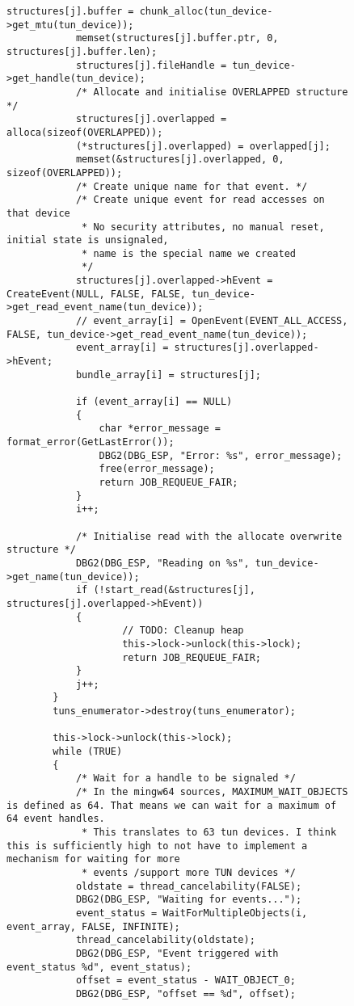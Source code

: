 \begin{figure}
\begin{lstlisting}[caption=Code für handle\_plain auf Windows]
            structures[j].buffer = chunk_alloc(tun_device->get_mtu(tun_device));
            memset(structures[j].buffer.ptr, 0, structures[j].buffer.len);
            structures[j].fileHandle = tun_device->get_handle(tun_device);
            /* Allocate and initialise OVERLAPPED structure */
            structures[j].overlapped = alloca(sizeof(OVERLAPPED));
            (*structures[j].overlapped) = overlapped[j];
            memset(&structures[j].overlapped, 0, sizeof(OVERLAPPED));
            /* Create unique name for that event. */
            /* Create unique event for read accesses on that device
             * No security attributes, no manual reset, initial state is unsignaled,
             * name is the special name we created
             */
            structures[j].overlapped->hEvent = CreateEvent(NULL, FALSE, FALSE, tun_device->get_read_event_name(tun_device));
            // event_array[i] = OpenEvent(EVENT_ALL_ACCESS, FALSE, tun_device->get_read_event_name(tun_device));
            event_array[i] = structures[j].overlapped->hEvent;
            bundle_array[i] = structures[j];

            if (event_array[i] == NULL)
            {
                char *error_message = format_error(GetLastError());
                DBG2(DBG_ESP, "Error: %s", error_message);
                free(error_message);
                return JOB_REQUEUE_FAIR;
            }
            i++;

            /* Initialise read with the allocate overwrite structure */
            DBG2(DBG_ESP, "Reading on %s", tun_device->get_name(tun_device));
            if (!start_read(&structures[j], structures[j].overlapped->hEvent))
            {
                    // TODO: Cleanup heap
                    this->lock->unlock(this->lock);
                    return JOB_REQUEUE_FAIR;
            }
            j++;
        }
        tuns_enumerator->destroy(tuns_enumerator);

        this->lock->unlock(this->lock);
        while (TRUE)
        {
            /* Wait for a handle to be signaled */
            /* In the mingw64 sources, MAXIMUM_WAIT_OBJECTS is defined as 64. That means we can wait for a maximum of 64 event handles.
             * This translates to 63 tun devices. I think this is sufficiently high to not have to implement a mechanism for waiting for more
             * events /support more TUN devices */
            oldstate = thread_cancelability(FALSE);
            DBG2(DBG_ESP, "Waiting for events...");
            event_status = WaitForMultipleObjects(i, event_array, FALSE, INFINITE);
            thread_cancelability(oldstate);
            DBG2(DBG_ESP, "Event triggered with event_status %d", event_status);
            offset = event_status - WAIT_OBJECT_0;
            DBG2(DBG_ESP, "offset == %d", offset);
            

\end{lstlisting}
\end{figure}
